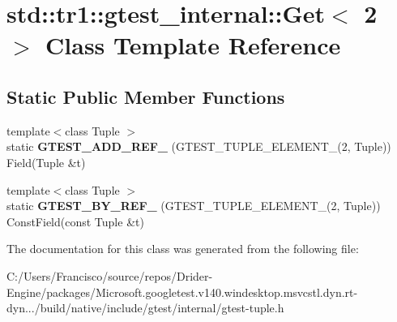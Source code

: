 \hypertarget{classstd_1_1tr1_1_1gtest__internal_1_1_get_3_012_01_4}{}\section{std\+:\+:tr1\+:\+:gtest\+\_\+internal\+:\+:Get$<$ 2 $>$ Class Template Reference}
\label{classstd_1_1tr1_1_1gtest__internal_1_1_get_3_012_01_4}
\subsection*{Static Public Member Functions}
\begin{DoxyCompactItemize}
\item 
\mbox{\label{classstd_1_1tr1_1_1gtest__internal_1_1_get_3_012_01_4_a8dfe7b5c1c915f10181e3fb5952ba6d8}} 
{\footnotesize template$<$class Tuple $>$ }\\static {\bfseries G\+T\+E\+S\+T\+\_\+\+A\+D\+D\+\_\+\+R\+E\+F\+\_\+} (G\+T\+E\+S\+T\+\_\+\+T\+U\+P\+L\+E\+\_\+\+E\+L\+E\+M\+E\+N\+T\+\_\+(2, Tuple)) Field(Tuple \&t)
\item 
\mbox{\label{classstd_1_1tr1_1_1gtest__internal_1_1_get_3_012_01_4_a76127c9c03c1f0caa61fb87d4d756b5b}} 
{\footnotesize template$<$class Tuple $>$ }\\static {\bfseries G\+T\+E\+S\+T\+\_\+\+B\+Y\+\_\+\+R\+E\+F\+\_\+} (G\+T\+E\+S\+T\+\_\+\+T\+U\+P\+L\+E\+\_\+\+E\+L\+E\+M\+E\+N\+T\+\_\+(2, Tuple)) Const\+Field(const Tuple \&t)
\end{DoxyCompactItemize}


The documentation for this class was generated from the following file\+:\begin{DoxyCompactItemize}
\item 
C\+:/\+Users/\+Francisco/source/repos/\+Drider-\/\+Engine/packages/\+Microsoft.\+googletest.\+v140.\+windesktop.\+msvcstl.\+dyn.\+rt-\/dyn.../build/native/include/gtest/internal/gtest-\/tuple.\+h\end{DoxyCompactItemize}
